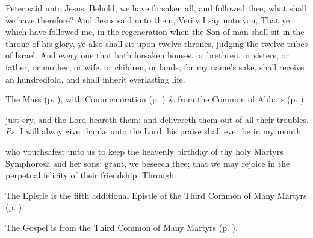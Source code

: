  Peter said unto Jesus: Behold, we have forsaken all, and followed thee; what shall we have therefore? And Jesus said unto them, Verily I say unto you, That ye which have followed me, in the regeneration when the Son of man shall sit in the throne of his glory, ye also shall sit upon twelve thrones, judging the twelve tribes of Israel. And every one that hath forsaken houses, or brethren, or sisters, or father, or mother, or wife, or children, or lands, for my name's sake, shall receive an hundredfold, and shall inherit everlasting life.



\begin{rubric}
	The Mass  (p. \pageref{RaphaelBrooklyn}), with Commemoration  (p. \pageref{Symphorosa}) \&  from the Common of Abbots (p. \pageref{CommonAbbots}).
\end{rubric}


\label{Symphorosa}

\introit
{} just cry, and the Lord heareth them: and delivereth them out of all their troubles. \textit{Ps.} I will alway give thanks unto the Lord; his praise shall ever be in my mouth.

\collect
{} who vouchsafest unto us to keep the heavenly birthday of thy holy Martyrs Symphorosa and her sons: grant, we beseech thee; that we may rejoice in the perpetual felicity of their friendship. Through.

\begin{rubric}
	The Epistle is the fifth additional Epistle of the Third Common of Many Martyrs (p. \pageref{Hebrews1133}).
\end{rubric}


\begin{rubric}
	The Gospel is from the Third Common of Many Martyrs (p. \pageref{CommonMartyrsIIIGospel}).
\end{rubric}

